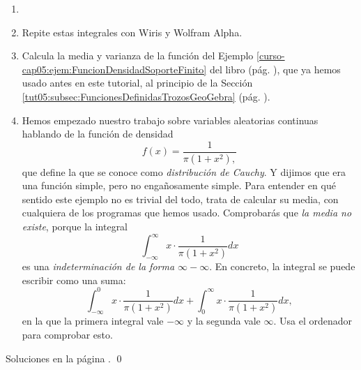 \documentclass[10pt,a4paper]{article}\usepackage[]{graphicx}\usepackage[]{color}
\newcounter{cont01}
\begin{document}
\begin{ejercicio}
\label{tut05:ejercicio15}
\begin{enumerate}
  \item[]
  \item Repite estas integrales con Wiris y Wolfram Alpha.

  \item Calcula la media y varianza de la función del Ejemplo \ref{curso-cap05:ejem:FuncionDensidadSoporteFinito} del libro (pág. \pageref{curso-cap05:ejem:FuncionDensidadSoporteFinito}), que ya hemos usado antes en este tutorial, al principio de la Sección \ref{tut05:subsec:FuncionesDefinidasTrozosGeoGebra} (pág. \pageref{tut05:subsec:FuncionesDefinidasTrozosGeoGebra}).

  \item
   Hemos empezado nuestro trabajo sobre variables aleatorias continuas hablando de la función de densidad
  \[f(x)=\dfrac{1}{\pi(1+x^2),}\]
  que define la que se conoce como {\em distribución de Cauchy}. Y dijimos que era una función simple, pero no engañosamente simple. Para entender en qué sentido este ejemplo no es trivial del todo, trata de calcular su media, con cualquiera de los programas que hemos usado. Comprobarás que {\em la media no existe}, porque la integral
  \[\int_{-\infty}^{\infty} x\cdot \dfrac{1}{\pi(1+x^2)} dx\]
  es una {\em indeterminación de la forma $\infty - \infty$}. En concreto, la integral se puede escribir como una suma:
  \[\int_{-\infty}^{0} x\cdot \dfrac{1}{\pi(1+x^2)} dx + \int_{0}^{\infty} x\cdot \dfrac{1}{\pi(1+x^2)} dx,\]
  en la que la primera integral vale $-\infty$ y la segunda vale $\infty$. Usa el ordenador para comprobar esto.
\end{enumerate}
Soluciones en la página \pageref{tut05:ejercicio15:sol}.
\qed
\end{ejercicio}
\end{document}
